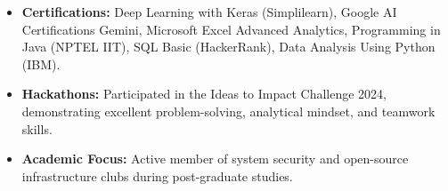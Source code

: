 \documentclass[letterpaper,10pt]{article}
\begin{document}
\begin{itemize}
\item \textbf{Certifications:} Deep Learning with Keras (Simplilearn), Google AI Certifications Gemini, Microsoft Excel Advanced Analytics, Programming in Java (NPTEL IIT), SQL Basic (HackerRank), Data Analysis Using Python (IBM).
\item \textbf{Hackathons:} Participated in the Ideas to Impact Challenge 2024, demonstrating excellent problem-solving, analytical mindset, and teamwork skills.
\item \textbf{Academic Focus:} Active member of system security and open-source infrastructure clubs during post-graduate studies.
\end{itemize}

\end{document}
